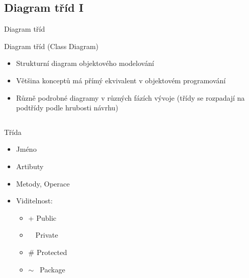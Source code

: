 \subsection{Diagram tříd I}




\begin{frame}{Diagram tříd}

\onslide<+->Diagram tříd (Class Diagram)
\begin{itemize}[<+->]
    \item Strukturní diagram objektového modelování
    \item Většina konceptů má přímý ekvivalent v objektovém programování
    \item Různě podrobné diagramy v různých fázích vývoje 
             (třídy se rozpadají na podtřídy podle hrubosti návrhu)
\end{itemize}

\begin{columns}[T]

    \begin{column}{0.40\textwidth}
        Třída  
        \begin{itemize}
            \item<6-> Jméno
            \item<6-> Artibuty
            \item<6-> Metody, Operace
            \item<6-> Viditelnost:
            \begin{itemize}
                \item + Public
                \item \textendash ~~Private
                \item \# Protected
                \item $\sim$ ~Package
            \end{itemize}
            
        \end{itemize}
    \end{column}

    \begin{column}{0.55\textwidth}
		\onslide<5->
		\begin{figure}
		\end{figure}
    \end{column}

\end{columns}
\end{frame}

